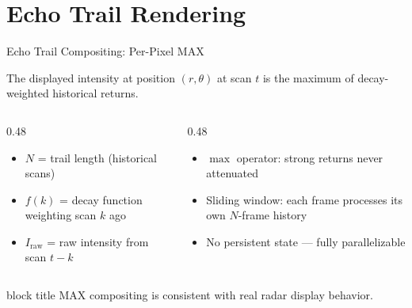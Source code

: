 \documentclass[aspectratio=169, 10pt]{beamer}
\newcommand{\keypoint}[1]{%
  \vfill
  \begin{beamercolorbox}[wd=\textwidth, dp=0.4em, leftskip=0.3cm]{block title}%
    \small #1%
  \end{beamercolorbox}%
}
\begin{document}
\section{Echo Trail Rendering}

\begin{frame}{Echo Trail Compositing: Per-Pixel MAX}

The displayed intensity at position $(r, \theta)$ at scan $t$ is the
maximum of decay-weighted historical returns.

\vspace{0.3cm}

\begin{center}
\end{center}

\vspace{0.3cm}

\begin{columns}[T]
\begin{column}{0.48\textwidth}
  \begin{itemize}
    \item $N$ = trail length (historical scans)
    \item $f(k)$ = decay function weighting scan $k$ ago
    \item $I_{\text{raw}}$ = raw intensity from scan $t{-}k$
  \end{itemize}
\end{column}
\begin{column}{0.48\textwidth}
  \begin{itemize}
    \item $\max$ operator: strong returns never attenuated
    \item Sliding window: each frame processes its own $N$-frame history
    \item No persistent state --- fully parallelizable
  \end{itemize}
\end{column}
\end{columns}

\keypoint{MAX compositing is consistent with real radar display behavior.}
\end{frame}
\end{document}
